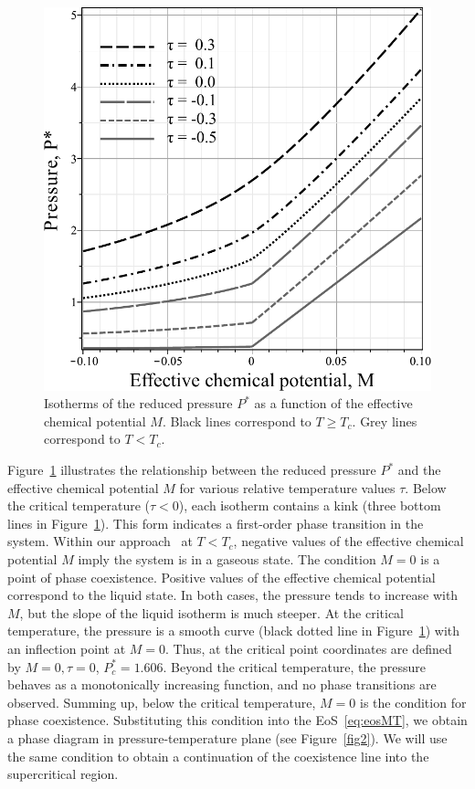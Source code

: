 \begin{figure}[t!]
	\centering
	\includegraphics[width=\column]{f1.pdf} 
	\vskip-3mm\caption{Isotherms of the reduced pressure $P^*$ as a function of the effective chemical potential $M$. Black lines correspond to $T \geq T_c$. Grey lines correspond to $T < T_c$. 
	}\label{fig1}
\end{figure}
Figure~\ref{fig1} illustrates the relationship between the reduced pressure $P^*$ and the effective chemical potential $M$ for various relative temperature values $\tau$. Below the critical temperature ($\tau < 0$), each іsotherm contains a kink (three bottom lines in Figure~\ref{fig1}). This form indicates a first-order phase transition in the system. Within our approach~\cite{KD20} at $T<T_c$, negative values of the effective chemical potential $M$ imply the system is in a gaseous state. The condition $M=0$ is a point of phase coexistence. Positive values of the effective chemical potential correspond to the liquid state. In both cases, the pressure tends to increase with $M$, but the slope of the liquid isotherm is much steeper. At the critical temperature, the pressure is a smooth curve (black dotted line in Figure~\ref{fig1}) with an inflection point at $M=0$. Thus, at the critical point coordinates are defined by $M=0, \tau=0$, $P^*_c = 1.606$. Beyond the critical temperature, the pressure behaves as a monotonically increasing function, and no phase transitions are observed. Summing up, below the critical temperature, $M=0$ is the condition for phase coexistence. Substituting this condition into the EoS~\eqref{eq:eosMT}, we obtain a phase diagram in pressure-temperature plane (see Figure~\ref{fig2}). We will use the same condition to obtain a continuation of the coexistence line into the supercritical region. 
